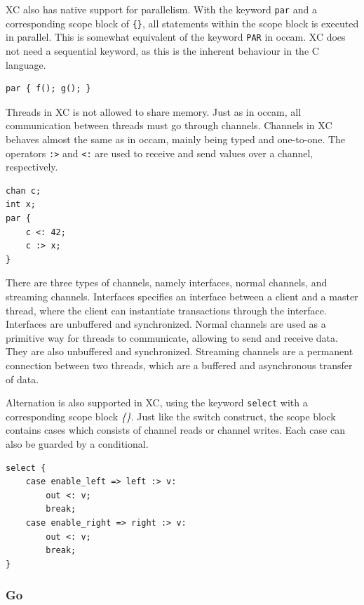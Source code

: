 XC also has native support for parallelism. With the keyword \texttt{par} and a corresponding scope block of \texttt{\{\}}, all statements within the scope block is executed in parallel. This is somewhat equivalent of the keyword \texttt{PAR} in occam. XC does not need a sequential keyword, as this is the inherent behaviour in the C language. 

\begin{lstlisting}[style={CustomC},frame={},numbers={none},xleftmargin={4em}]
par { f(); g(); }
\end{lstlisting}

Threads in XC is not allowed to share memory. Just as in occam, all communication between threads must go through channels. Channels in XC behaves almost the same as in occam, mainly being typed and one\hyp{}to\hyp{}one. The operators \texttt{:>} and \texttt{<:} are used to receive and send values over a channel, respectively. 

\begin{lstlisting}[style={CustomC},frame={},numbers={none},xleftmargin={4em}]
chan c;
int x;
par {
    c <: 42;
    c :> x;
}
\end{lstlisting}

There are three types of channels, namely interfaces, normal channels, and streaming channels. Interfaces specifies an interface between a client and a master thread, where the client can instantiate transactions through the interface. Interfaces are unbuffered and synchronized. Normal channels are used as a primitive way for threads to communicate, allowing to send and receive data. They are also unbuffered and synchronized. Streaming channels are a permanent connection between two threads, which are a buffered and asynchronous transfer of data.

Alternation is also supported in XC, using the keyword \texttt{select} with a corresponding scope block \textit{\{\}}. Just like the switch construct, the scope block contains cases which consists of channel reads or channel writes. Each case can also be guarded by a conditional.

\begin{lstlisting}[style={CustomC},frame={},numbers={none},xleftmargin={4em}]
select {
    case enable_left => left :> v:
        out <: v;
        break;
    case enable_right => right :> v:
        out <: v;
        break;
}
\end{lstlisting}


\subsubsection{Go}
\label{sssec:go}

